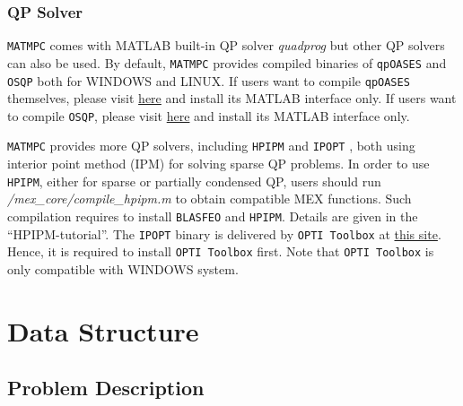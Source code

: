 \documentclass{article}
\newcommand{\software}[1]{{\tt#1}}
\begin{document}
\subsubsection{QP Solver}
\software{MATMPC} comes with MATLAB built-in QP solver \emph{quadprog} but other QP solvers can also be used. By default, \software{MATMPC} provides compiled binaries of \software{qpOASES} \cite{ferreau2014qpoases} and \software{OSQP} \cite{stellato2018osqp} both for WINDOWS and LINUX. If users want to compile \software{qpOASES} themselves, please visit \href{https://projects.coin-or.org/qpOASES/wiki/QpoasesInstallation}{here} and install its MATLAB interface only. If users want to compile \software{OSQP}, please visit \href{https://osqp.org/}{here} and install its MATLAB interface only.

\software{MATMPC} provides more QP solvers, including \software{HPIPM} and \software{IPOPT} \cite{wachter2006implementation}, both using interior point method (IPM) for solving sparse QP problems. In order to use \software{HPIPM}, either for sparse or partially condensed QP, users should run \emph{/mex\_core/compile\_hpipm.m} to obtain compatible MEX functions. Such compilation requires to install \software{BLASFEO} and \software{HPIPM}. Details are given in the ``HPIPM-tutorial''. The \software{IPOPT} binary is delivered by \software{OPTI Toolbox} at \href{https://www.inverseproblem.co.nz/OPTI/}{this site}. Hence, it is required to install \software{OPTI Toolbox} first. Note that \software{OPTI Toolbox} is only compatible with WINDOWS system.

\section{Data Structure}

\subsection{Problem Description}
\end{document}

